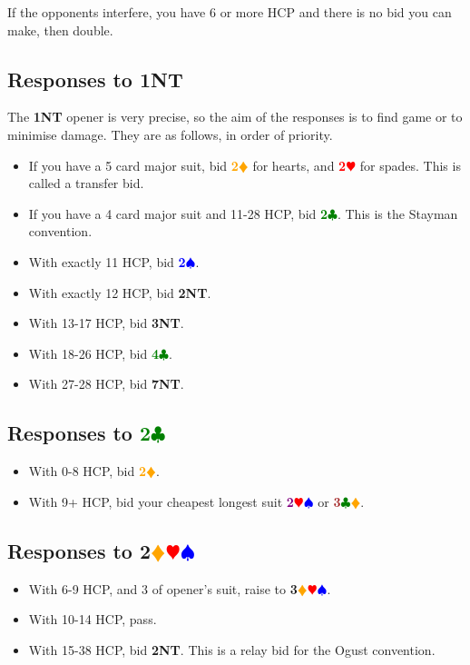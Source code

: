 \documentclass{article}
\newcommand{\Hs}{\textcolor{Red}{$\varheart$}}
\newcommand{\Ss}{\textcolor{Blue}{$\spadesuit$}}
\newcommand{\Ds}{\textcolor{Orange}{$\vardiamond$}}
\newcommand{\Cs}{\textcolor{Green}{$\clubsuit$}}
\newcommand{\NTs}{\textbf{\footnotesize{NT}}}
\renewcommand{\H}[1]{\textcolor{Red}{\textbf{#1}\Hs}}
\renewcommand{\S}[1]{\textcolor{Blue}{\textbf{#1}\Ss}}
\newcommand{\D}[1]{\textcolor{Orange}{\textbf{#1}\Ds}}
\newcommand{\C}[1]{\textcolor{Green}{\textbf{#1}\Cs}}
\newcommand{\NT}[1]{\textbf{#1\NTs}}
\newcommand{\minors}[1]{\textcolor{Brown}{\textbf{#1}}\Cs\Ds}
\newcommand{\majors}[1]{\textcolor{Purple}{\textbf{#1}}\Hs\Ss}
\newcommand{\notclubs}[1]{\textbf{#1}\Ds\Hs\Ss}
\begin{document}
If the opponents interfere, you have 6 or more HCP and there is no bid you can make, then double.

\subsection{Responses to \NT{1}}

The \NT{1} opener is very precise, so the aim of the responses is to find game or to minimise damage. They are as follows, in order of priority.

\begin{itemize}
\item If you have a 5 card major suit, bid \D{2} for hearts, and \H{2} for spades. This is called a transfer bid.
\item If you have a 4 card major suit and 11-28 HCP, bid \C{2}. This is the Stayman convention.
\item With exactly 11 HCP, bid \S{2}.
\item With exactly 12 HCP, bid \NT{2}.
\item With 13-17 HCP, bid \NT{3}.
\item With 18-26 HCP, bid \C{4}.
\item With 27-28 HCP, bid \NT{7}.
\end{itemize}

\subsection{Responses to \C{2}}

\begin{itemize}
\item With 0-8 HCP, bid \D{2}.
\item With 9+ HCP, bid your cheapest longest suit \majors{2} or \minors{3}.
\end{itemize}

\subsection{Responses to \notclubs{2}}

\begin{itemize}
\item With 6-9 HCP, and 3 of opener's suit, raise to \notclubs{3}.
\item With 10-14 HCP, pass.
\item With 15-38 HCP, bid \NT{2}. This is a relay bid for the Ogust convention.
\end{itemize}
\end{document}
